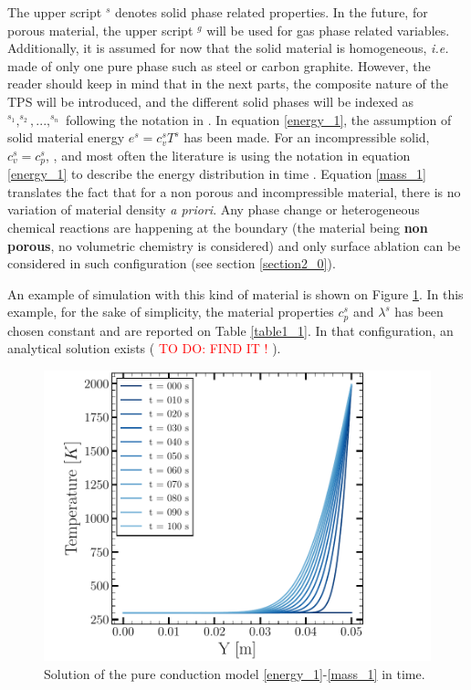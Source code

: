 \documentclass[english,10pt,a4paper,oneside,twocolumn,titlepage]{report}
\begin{document}
	 The upper script $^s$ denotes solid phase related
	 properties. In the future, for porous material, the 
	 upper script $^g$ will be used for gas phase related
	 variables. Additionally, it is assumed for now that
	 the solid material is homogeneous, \textit{i.e.} made
	 of only one pure phase such as steel or carbon graphite.
	 However, the reader should keep in mind that in the
	 next parts, the composite nature of the TPS will be 
	 introduced, and the different solid phases will be 
	 indexed as $^{s_1}, ^{s_2},  ..., ^{s_n}$ following the
	 notation in \cite{Marschall2015}. 
	 In equation \eqref{energy_1}, the assumption of solid 
	 material energy $e^s = c_v^s T^s$ has been made. 
	 For an incompressible solid, $c_v^s = c_p^s$, 
	 \cite{Hahn2012}, and most often the literature is 
	 using the notation in equation \eqref{energy_1} to
	 describe the energy distribution in time
	  \cite{Lachaud2017}.
	 Equation \eqref{mass_1} translates the fact that for
	 a non porous and incompressible material,
	  there is no variation of material
	 density \textit{a priori}. 
	 Any phase change or heterogeneous chemical 
	 reactions are 
	 happening at the boundary (the material being \textbf{
	 non porous}, no volumetric chemistry is considered) and
	 only surface ablation can be considered in such 
	 configuration (see section \ref{section2_0}). 
	 
	 An example of simulation with this kind of material is
	 shown on Figure \ref{figure1_2}. In this example, for 
	 the sake of simplicity, the material properties $c_p^s$ 
	 and $\lambda^s$ has been chosen constant and are 
	 reported on Table \ref{table1_1}. In that configuration, 
	 an analytical solution exists \cite{Hahn2012} (
	 \textcolor{red}{TO DO: FIND IT !}
	 ).
	 
	\begin{figure}[h]
	\centering
	\includegraphics[scale=0.5, angle=0]{FIGURES/CONDUCTION}
	\caption{\label{figure1_2} Solution of the pure 
	conduction model \eqref{energy_1}-\eqref{mass_1}
	in time.}
	\end{figure}
	
\end{document}
